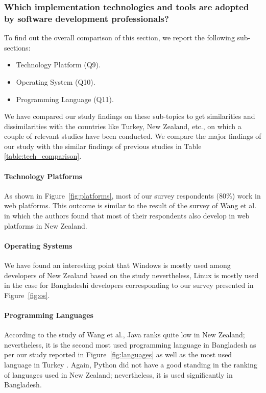 \subsubsection{Which implementation technologies and tools are adopted by software development professionals?}

To find out the overall comparison of this section, we report the following sub-sections:
\begin{itemize}
\item Technology Platform (Q9).
\item Operating System (Q10).
\item Programming Language (Q11).
\end{itemize}

We have compared our study findings on these sub-topics to get similarities and dissimilarities with the countries like Turkey, New Zealand, etc., on which a couple of relevant studies have been conducted. We compare the major findings of our study with the similar findings of previous studies in Table \ref{table:tech_comparison}.



\paragraph{Technology Platforms}
As shown in Figure~\ref{fig:platforms}, most of our survey respondents (80\%) work in web platforms. This outcome is similar to the result of the survey of Wang et al. \citep{Wang2018} in which the authors found that most of their respondents also develop in web platforms in New Zealand.


\paragraph{Operating Systems}
We have found an interesting point that Windows is mostly used among developers of New Zealand based on the study \citep{Wang2018} nevertheless, Linux is mostly used in the case for Bangladeshi developers corresponding to our survey presented in Figure~\ref{fig:os}.


\paragraph{Programming Languages}
According to the study of Wang et al.\citep{Wang2018}, Java ranks quite low in New Zealand; nevertheless, it is the second most used programming language in Bangladesh as per our study reported in Figure~\ref{fig:languages} as well as the most used language in Turkey \citep{Garousi2015}. Again, Python did not have a good standing in the ranking of languages used in New Zealand; nevertheless, it is used significantly in Bangladesh.

